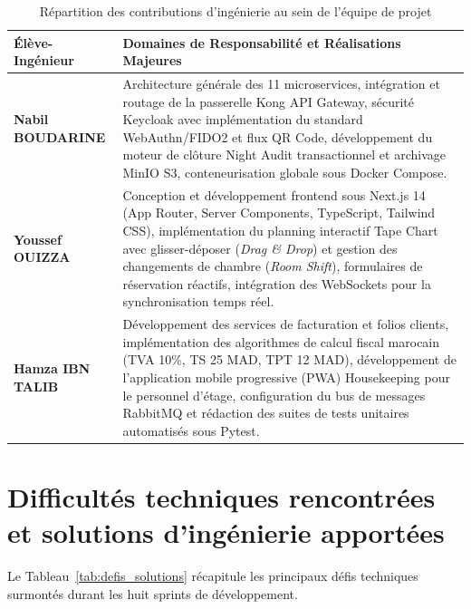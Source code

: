 \documentclass[12pt,a4paper,oneside]{report}
\begin{document}
\begin{table}[H]
\centering
\small
\renewcommand{\arraystretch}{1.3}
\begin{tabularx}{\textwidth}{|p{3.5cm}|X|}
\hline
\textbf{Élève-Ingénieur} & \textbf{Domaines de Responsabilité et Réalisations Majeures} \\
\hline
\textbf{Nabil BOUDARINE} & Architecture générale des 11 microservices, intégration et routage de la passerelle Kong API Gateway, sécurité Keycloak avec implémentation du standard WebAuthn/FIDO2 et flux QR Code, développement du moteur de clôture Night Audit transactionnel et archivage MinIO S3, conteneurisation globale sous Docker Compose. \\
\hline
\textbf{Youssef OUIZZA} & Conception et développement frontend sous Next.js 14 (App Router, Server Components, TypeScript, Tailwind CSS), implémentation du planning interactif Tape Chart avec glisser-déposer (\textit{Drag \& Drop}) et gestion des changements de chambre (\textit{Room Shift}), formulaires de réservation réactifs, intégration des WebSockets pour la synchronisation temps réel. \\
\hline
\textbf{Hamza IBN TALIB} & Développement des services de facturation et folios clients, implémentation des algorithmes de calcul fiscal marocain (TVA 10\%, TS 25 MAD, TPT 12 MAD), développement de l'application mobile progressive (PWA) Housekeeping pour le personnel d'étage, configuration du bus de messages RabbitMQ et rédaction des suites de tests unitaires automatisés sous Pytest. \\
\hline
\end{tabularx}
\caption{Répartition des contributions d'ingénierie au sein de l'équipe de projet}
\label{tab:contributions_detail}
\end{table}

\section{Difficultés techniques rencontrées et solutions d'ingénierie apportées}

Le Tableau~\ref{tab:defis_solutions} récapitule les principaux défis techniques surmontés durant les huit sprints de développement.
\end{document}
